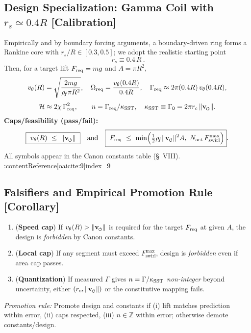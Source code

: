 \documentclass[10pt,reprint,aps,onecolumn,nofootinbib]{revtex4-2}
\newcommand{\vnorm}{\lVert \mathbf{v}_{\mkern-2mu\scriptscriptstyle\boldsymbol{\circlearrowleft}} \rVert}               %
\newcommand{\rc}{r_c}                                    %
\providecommand{\rc}{r_c}
\newcommand{\rhoF}{\rho_{\!f}}     %
\begin{document}
    \subsection{Design Specialization: Gamma Coil with $r_s\simeq 0.4R$ [Calibration]}
    \label{subsec:GammaSpec}
    Empirically and by boundary forcing arguments, a boundary-driven ring forms a Rankine core with %
    $r_s/R\in[0.3,0.5]$; we adopt the realistic starting point
    \[
        \boxed{\ r_s \equiv 0.4\,R\ }.
    \]
    Then, for a target lift $F_{\rm req}=m g$ and $A=\pi R^2$,
    \[
        v_\theta(R)=\sqrt{\frac{2 m g}{\rhoF \pi R^2}},\quad
        \Omega_{\rm req}=\frac{v_\theta(0.4R)}{0.4R},\quad
        \Gamma_{\rm req}\approx 2\pi (0.4R)\,v_\theta(0.4R),
    \]
    \[
        \mathcal{H}\approx 2\chi\,\Gamma_{\rm req}^{2},\qquad n=\Gamma_{\rm req}/\kappa_{\rm SST},\quad \kappa_{\rm SST} \equiv \Gamma_0 = 2\pi \rc\,\vnorm.
    \]
    \textbf{Caps/feasibility (pass/fail):}
    \begin{equation}
        \boxed{\ v_\theta(R)\ \le\ \vnorm\ }\quad\text{and}\quad
        \boxed{\ F_{\rm req}\ \le\ \min\!\Big(\tfrac{1}{2}\rhoF \vnorm^{2} A,\ N_{\rm act}\,F_{\text{swirl}}^{\max}\Big) }.
    \end{equation}
    All symbols appear in the Canon constants table (\S~VIII). :contentReference[oaicite:9]{index=9}

    \subsection{Falsifiers and Empirical Promotion Rule [Corollary]}
    \label{subsec:Falsifiers}
    \begin{enumerate}\itemsep4pt
    \item (\textbf{Speed cap}) If $v_\theta(R)>\vnorm$ is required for the target $F_{\rm req}$ at given $A$, the design is \emph{forbidden} by Canon constants.
    \item (\textbf{Local cap}) If any segment must exceed $F_{\text{swirl}}^{\max}$, design is \emph{forbidden} even if area cap passes.
    \item (\textbf{Quantization}) If measured $\Gamma$ gives $n=\Gamma/\kappa_{\rm SST}$ \emph{non-integer} beyond uncertainty, either $(\rc,\vnorm)$ or the constitutive mapping fails.
    \end{enumerate}
    \emph{Promotion rule:} Promote design and constants if (i) lift matches prediction within error, (ii) caps respected, (iii) $n\in\mathbb{Z}$ within error; otherwise demote constants/design.
\end{document}
